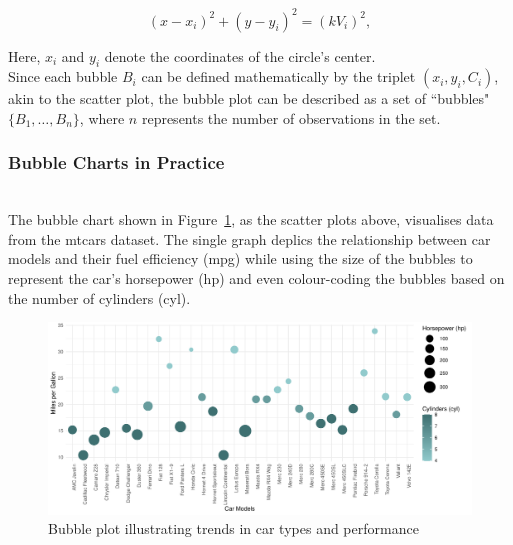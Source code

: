 \documentclass{article}\usepackage[]{graphicx}\usepackage[]{xcolor}
\makeatletter
\def\maxwidth{ %
  \ifdim\Gin@nat@width>\linewidth
    \linewidth
  \else
    \Gin@nat@width
  \fi
}
\newenvironment{knitrout}{}{} %
\numberwithin{equation}{section}
\makeatother
\begin{document}
\[
(x - x_i)^2 + (y - y_i)^2 = (kV_i)^2 ,
\]

\noindent Here, \(x_i\) and \(y_i\) denote the coordinates of the circle's center.\\

\noindent Since each bubble \(B_i\) can be defined mathematically by the triplet \((x_i, y_i, C_i)\), akin to the scatter plot, the bubble plot can be described as a set of ``bubbles" \( \{B_1, \ldots, B_n\}\), where \(n\) represents the number of observations in the set.\\

\noindent
\subsubsection{Bubble Charts in Practice}\\

\noindent The bubble chart shown in Figure~\ref{fig:bubble-plot}, as the scatter plots above, visualises data from the mtcars dataset. The single graph deplics the relationship between car models and their fuel efficiency (mpg) while using the size of the bubbles to represent the car's horsepower (hp) and even colour-coding the bubbles based on the number of cylinders (cyl).\\

\begin{knitrout}\scriptsize
{}\color{fgcolor}\begin{figure}[H]

{\centering \includegraphics[width=\maxwidth]{figure/beamer-bubble-plot-1} 

}

\caption[Bubble plot illustrating trends in car types and performance]{Bubble plot illustrating trends in car types and performance}\label{fig:bubble-plot}
\end{figure}

\end{knitrout}
\end{document}
